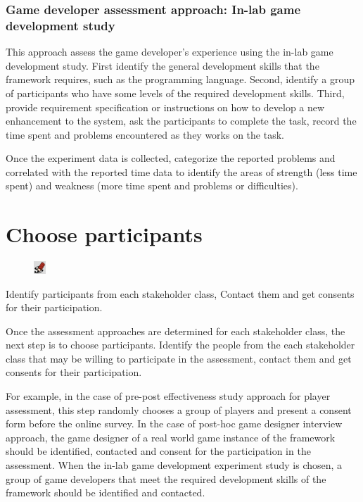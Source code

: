 \documentclass[11pt,oneside]{book}
\begin{document}
\subsubsection{Game developer assessment approach: In-lab game development study}
\label{In-lab game development study}

This approach assess the game developer's experience using the in-lab game development study.  
First identify the general development skills that the framework requires, such as the programming language. 
Second, identify a group of participants who have some levels of the required development skills. Third, provide 
requirement specification or instructions on how to develop a new enhancement to the system, ask the 
participants to complete the task, record the time spent and problems encountered as they works on the task.

Once the experiment data is collected, categorize the reported problems and correlated with the reported time data 
to identify the areas of strength (less time spent) and weakness (more time spent and problems or difficulties). 

\section {Choose participants}
\begin{shadebox}
\begin{figure}
\vspace{-15pt}\hspace{-10pt}
    \includegraphics[width=0.04\textwidth]{note-icon}
\end{figure}
Identify participants from each stakeholder class, Contact them and get consents for their participation.
\end{shadebox}

Once the assessment approaches are determined for each stakeholder class, the next step is to choose participants. 
Identify the  people from the each stakeholder class that may be willing to participate in the assessment, contact them 
and get consents for their participation. 

For example, in the case of pre-post effectiveness study approach for player assessment, this step randomly chooses a 
group of players and present a consent form before the online survey.  In the case of post-hoc game designer interview 
approach, the game designer of a real world game instance of the framework should be identified, contacted and consent 
for the participation in the assessment. When the in-lab game development experiment study is chosen, a group of game 
developers that meet the required development skills of the framework should be identified and contacted.
\end{document}
